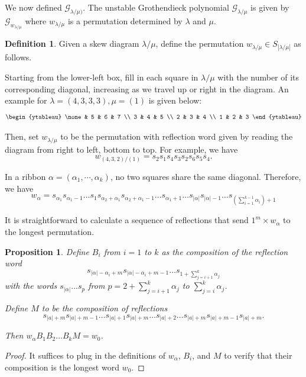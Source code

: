 \documentclass[12pt]{amsart}
\newtheorem{prop}[thm]{Proposition}
\theoremstyle{definition}
\newtheorem{defn}[thm]{Definition}
\begin{document}
We now defined $\mathcal{G}_{\lambda/\mu)}$. The unstable Grothendieck polynomial $\mathcal{G}_{\lambda/\mu}$ is given by $\mathcal{G}_{w_{\lambda/\mu}}$ where $w_{\lambda/\mu}$ is a permutation determined by $\lambda$ and $\mu$. 

\begin{defn}
Given a skew diagram $\lambda/\mu$, define the permutation $w_{\lambda/\mu} \in S_{|\lambda/\mu|}$ as follows. 

Starting from the lower-left box, fill in each square in $\lambda/\mu$ with the number of its corresponding diagonal, increasing as we travel up or right in the diagram. An example for $\lambda = (4,3,3,3), \mu = (1)$ is given below:
$$\begin{ytableau} 
\none & 5 & 6 & 7 \\ 
3 & 4 & 5 \\ 
2 & 3 & 4 \\
1 & 2 & 3
\end{ytableau}$$

Then, set $w_{\lambda/\mu}$ to be the permutation with reflection word given by reading the diagram from right to left, bottom to top. For example, we have $$w_{(4,3,2)/(1)} = s_2s_1s_4s_3s_2s_6s_5s_4.$$
\end{defn}

In a ribbon $\alpha=(\alpha_1,\cdots,\alpha_k)$, no two squares share the same diagonal. Therefore, we have 
$$w_\alpha = s_{\alpha_1}s_{\alpha_1-1}\ldots s_1 s_{\alpha_2+\alpha_1} s_{\alpha_2+\alpha_1-1}\ldots s_{\alpha_1+1} \ldots s_{|\alpha|}s_{|\alpha|-1}\ldots s_{(\sum_{i=1}^{k-1} \alpha_i) + 1}$$

It is straightforward to calculate a sequence of reflections that send $1^m \times w_\alpha$ to the longest permutation.

\begin{prop}
Define $B_i$ from $i = 1$ to $k$ as the composition of the reflection word 
$$s_{|\alpha| - \alpha_i + m}s_{|\alpha| - \alpha_i + m - 1} \ldots s_{1 + \sum_{j=i+1}^k \alpha_j}$$ 
with the words $s_{|\alpha|} ... s_p$ from $p = 2 + \sum_{j=i+1}^k \alpha_j$ to $\sum_{j=i}^k \alpha_j$. 

Define $M$ to be the composition of reflections $$s_{|a|+m}s_{|a|+m-1}\ldots s_{|a|+1} s_{|a|+m} \ldots s_{|a|+2} \ldots s_{|a|+m}s_{|a|+m-1}s_{|a|+m}.$$

Then $w_\alpha B_1B_2 \ldots B_k M = w_0$.
\end{prop}

\begin{proof}
It suffices to plug in the definitions of $w_\alpha$, $B_i$, and $M$ to verify that their composition is the longest word $w_0$. 
\end{proof}
\end{document}
